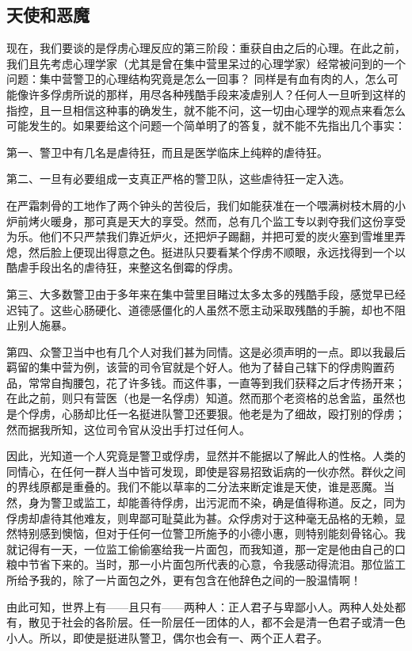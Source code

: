 \documentclass[11pt,oneside]{book}
\begin{document}
\begin{common-format}
\section{天使和恶魔}
现在，我们要谈的是俘虏心理反应的第三阶段：重获自由之后的心理。在此之前，我们且先考虑心理学家（尤其是曾在集中营里呆过的心理学家）经常被问到的一个问题：集中营警卫的心理结构究竟是怎么一回事？ 同样是有血有肉的人，怎么可能像许多俘虏所说的那样，用尽各种残酷手段来凌虐别人？任何人一旦听到这样的指控，且一旦相信这种事的确发生，就不能不问，这一切由心理学的观点来看怎么可能发生的。如果要给这个问题一个简单明了的答复，就不能不先指出几个事实：

第一、警卫中有几名是虐待狂，而且是医学临床上纯粹的虐待狂。

第二、一旦有必要组成一支真正严格的警卫队，这些虐待狂一定入选。

在严霜刺骨的工地作了两个钟头的苦役后，我们如能获准在一个喂满树枝木屑的小炉前烤火暖身，那可真是天大的享受。然而，总有几个监工专以剥夺我们这份享受为乐。他们不只严禁我们靠近炉火，还把炉子踢翻，并把可爱的炭火塞到雪堆里弄熄，然后脸上便现出得意之色。挺进队只要看某个俘虏不顺眼，永远找得到一个以酷虐手段出名的虐待狂，来整这名倒霉的俘虏。

第三、大多数警卫由于多年来在集中营里目睹过太多太多的残酷手段，感觉早已经迟钝了。这些心肠硬化、道德感僵化的人虽然不愿主动采取残酷的手腕，却也不阻止别人施暴。

第四、众警卫当中也有几个人对我们甚为同情。这是必须声明的一点。即以我最后羁留的集中营为例，该营的司令官就是个好人。他为了替自己辖下的俘虏购置药品，常常自掏腰包，花了许多钱。而这件事，一直等到我们获释之后才传扬开来；在此之前，则只有营医（也是一名俘虏）知道。然而那个老资格的总舍监，虽然也是个俘虏，心肠却比任一名挺进队警卫还要狠。他老是为了细故，殴打别的俘虏；然而据我所知，这位司令官从没出手打过任何人。

因此，光知道一个人究竟是警卫或俘虏，显然并不能据以了解此人的性格。人类的同情心，在任何一群人当中皆可发现，即使是容易招致诟病的一伙亦然。群伙之间的界线原都是重叠的。我们不能以草率的二分法来断定谁是天使，谁是恶魔。当然，身为警卫或监工，却能善待俘虏，出污泥而不染，确是值得称道。反之，同为俘虏却虐待其他难友，则卑鄙可耻莫此为甚。众俘虏对于这种毫无品格的无赖，显然特别感到懊恼，但对于任何一位警卫所施予的小德小惠，则特别能刻骨铭心。我就记得有一天，一位监工偷偷塞给我一片面包，而我知道，那一定是他由自己的口粮中节省下来的。当时，那一小片面包所代表的心意，令我感动得流泪。那位监工所给予我的，除了一片面包之外，更有包含在他辞色之间的一股温情啊！

由此可知，世界上有——且只有——两种人：正人君子与卑鄙小人。两种人处处都有，散见于社会的各阶层。任一阶层任一团体的人，都不会是清一色君子或清一色小人。所以，即使是挺进队警卫，偶尔也会有一、两个正人君子。


\end{common-format}
\end{document}
